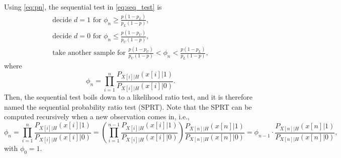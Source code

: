 Using \eqref{eq:pn}, the sequential test in \eqref{eq:seq_test} is
\begin{equation}
	\label{eq:seq_SPRT_mincost}
	\begin{array}{l}
		\text{decide } d = 1 \text{ for } \phi_n \geq \frac{p (1 - p_L)}{p_L(1 - p)}, \\
		\text{decide } d = 0 \text{ for } \phi_n \leq  \frac{p (1 - p_U)}{p_U (1 - p)}, \\
		\text{take another sample for } \frac{p (1 - p_U)}{p_U (1 - p)} < \phi_n < \frac{p (1 - p_L)}{p_L(1 - p)},
	\end{array}
\end{equation}
where
\begin{equation*}
	\phi_n = \prod_{i = 1}^{n} \frac{P_{X[i] | H}(x[i] | 1)}{P_{X[i] | H}(x[i] | 0)}.
\end{equation*}
Then, the sequential test boils down to a likelihood ratio test, and it is therefore named the sequential probability ratio test (SPRT). Note that the SPRT can be computed recursively when a new observation comes in, i.e.,
\begin{equation*}
	\phi_n = \prod_{i = 1}^{n} \frac{P_{X[i] | H}(x[i] | 1)}{P_{X[i] | H}(x[i] | 0)} = \left(\prod_{i = 1}^{n-1} \frac{P_{X[i] | H}(x[i] | 1)}{P_{X[i] | H}(x[i] | 0)}\right) \frac{P_{X[n] | H}(x[n] | 1)}{P_{X[n] | H}(x[n] | 0)} = \phi_{n-1} \cdot \frac{P_{X[n] | H}(x[n] | 1)}{P_{X[n] | H}(x[n] | 0)},
\end{equation*}
with $\phi_0 = 1$.

